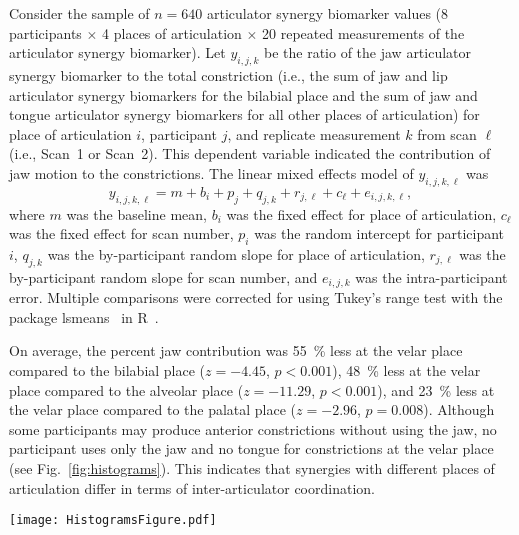 \documentclass[preprint]{JASAnew}
\begin{document}
Consider the sample of $n=640$ articulator synergy biomarker values (\num{8} participants $\times$ \num{4} places of articulation $\times$ \num{20} repeated measurements of the articulator synergy biomarker). Let $y_{i,j,k}$ be the ratio of the jaw articulator synergy biomarker to the total constriction (i.e., the sum of jaw and lip articulator synergy biomarkers for the bilabial place and the sum of jaw and tongue articulator synergy biomarkers for all other places of articulation) for place of articulation $i$, participant $j$, and replicate measurement $k$ from scan $\ell$ (i.e., Scan~1 or Scan~2). This dependent variable indicated the contribution of jaw motion to the constrictions. The linear mixed effects model of $y_{i,j,k,\ell}$ was 
%
\begin{equation}
y_{i,j,k,\ell} = m + b_i + p_j + q_{j,k} + r_{j,\ell} + c_\ell + e_{i,j,k,\ell},
\end{equation}
%
where $m$ was the baseline mean, $b_i$ was the fixed effect for place of articulation, $c_\ell$ was the fixed effect for scan number, $p_i$ was the random intercept for participant $i$, $q_{j,k}$ was the by-participant random slope for place of articulation, $r_{j,\ell}$ was the by-participant random slope for scan number, and $e_{i,j,k}$ was the intra-participant error. Multiple comparisons were corrected for using Tukey's range test with the package lsmeans~\citep{lenth2016least} in R~\citep{r2017language}.


On average, the percent jaw contribution was 
\SI{55}{\percent} less at the velar place compared to the bilabial place
($z=-4.45$, $p<0.001$),
\SI{48}{\percent} less at the velar place compared to the alveolar place
($z=-11.29$, $p<0.001$), and
\SI{23}{\percent} less at the velar place compared to the palatal place
($z=-2.96$, $p=0.008$). 
Although some participants may produce anterior constrictions without using the jaw, no participant uses only the jaw and no tongue for constrictions at the velar place (see Fig.~\ref{fig:histograms}). 
This indicates that synergies with different places of articulation differ in terms of inter-articulator coordination.





\begin{figure*}

\texttt{[image: HistogramsFigure.pdf]}

\caption{\label{fig:histograms}(color online) 
Distribution of the jaw contributions to constrictions at the bilabial, alveolar, palatal, velar, and pharyngeal places of articulation. The quantity plotted is the percent of a constriction that was produced by the jaw.
A value of \SI{0}{\percent} indicates that lip or tongue motion produced the entire constriction, whereas a value of \SI{100}{\percent} indicates that jaw motion produced the entire constriction. 
Distribution by participant shown with a different color for each participant.}

\end{figure*}
\end{document}
